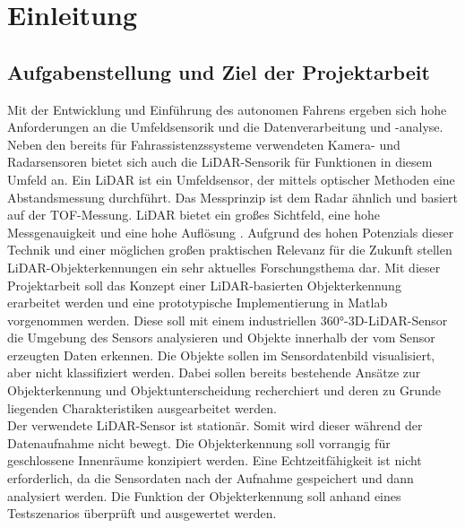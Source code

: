 
\chapter{Einleitung}\label{cha:Einleitung}

\section{Aufgabenstellung und Ziel der Projektarbeit}\label{sec:Aufgabenstellung}
Mit der Entwicklung und Einführung des autonomen Fahrens ergeben sich hohe Anforderungen an die Umfeldsensorik und die Datenverarbeitung und -analyse. Neben den bereits für Fahrassistenzssysteme verwendeten Kamera- und Radarsensoren bietet sich auch die \ac{LiDAR}-Sensorik für Funktionen in diesem Umfeld an. Ein \ac{LiDAR} ist ein Umfeldsensor, der mittels optischer Methoden eine Abstandsmessung durchführt. Das Messprinzip ist dem \ac{Radar} ähnlich und basiert auf der \ac{TOF}-Messung. \ac{LiDAR} bietet ein großes Sichtfeld, eine hohe Messgenauigkeit und eine hohe Auflösung \cite[vgl.][141]{Reif.2010}. 
Aufgrund des hohen Potenzials dieser Technik und einer möglichen großen praktischen Relevanz für die Zukunft stellen \ac{LiDAR}-Objekterkennungen ein sehr aktuelles Forschungsthema dar.
Mit dieser Projektarbeit soll das Konzept einer \ac{LiDAR}-basierten Objekterkennung erarbeitet werden und eine prototypische Implementierung in Matlab vorgenommen werden. Diese soll mit einem industriellen 360°-3D-\ac{LiDAR}-Sensor die Umgebung des Sensors analysieren und Objekte innerhalb der vom Sensor erzeugten Daten erkennen. Die Objekte sollen im Sensordatenbild visualisiert, aber nicht klassifiziert werden. 
Dabei sollen bereits bestehende Ansätze zur Objekterkennung und Objektunterscheidung recherchiert und deren zu Grunde liegenden Charakteristiken ausgearbeitet werden.\\
Der verwendete \ac{LiDAR}-Sensor ist stationär. Somit wird dieser während der Datenaufnahme nicht bewegt. Die Objekterkennung soll vorrangig für geschlossene Innenräume konzipiert werden. Eine Echtzeitfähigkeit ist nicht erforderlich, da die Sensordaten nach der Aufnahme gespeichert und dann analysiert werden. Die Funktion der Objekterkennung soll anhand eines Testszenarios überprüft und ausgewertet werden.

